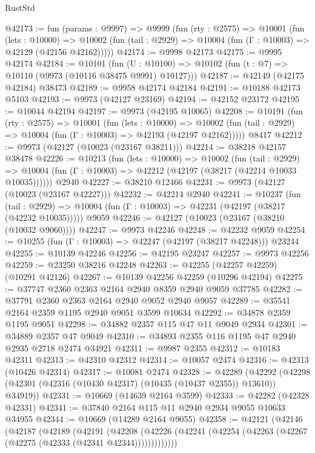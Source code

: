 \begin{lexlean}{RustStd}
\begin{coremodule}
@42173 := fun (params : @9997) =>
  @9999
    (fun (rty : @2575) =>
    @10001
      (fun (lets : @10000) =>
      @10002 (fun (tail : @2929) => @10004 (fun (Γ : @10003) => @42129 (@42156 @42162)))))
@42174 := @9998 @42173
@42175 := @9995 @42174
@42184 := @10101
    (fun (U : @10100) => @10102 (fun (t : @7) => @10110 (@9973 (@10116 @38475 @9991) @10127)))
@42187 := @42149 (@42175 @42184) @38473
@42189 := @9958 @42174 @42184
@42191 := @10188 @42173 @5103
@42193 := @9973 (@42127 @23169)
@42194 := @42152 @23172
@42195 := @10044 @42194
@42197 := @9973 (@42195 @10065)
@42208 := @10191
    (fun (rty : @2575) =>
    @10001
      (fun (lets : @10000) =>
      @10002 (fun (tail : @2929) => @10004 (fun (Γ : @10003) => @42193 (@42197 @42162)))))
    @8417
@42212 := @9973 (@42127 (@10023 (@23167 @38211)))
@42214 := @38218 @42157 @38478
@42226 := @10213
    (fun (lets : @10000) =>
    @10002
      (fun (tail : @2929) =>
      @10004 (fun (Γ : @10003) => @42212 (@42197 (@38217 (@42214 @10033 @10035))))))
    @2940
@42227 := @38210 @12466
@42231 := @9973 (@42127 (@10023 (@23167 @42227)))
@42232 := @42214 @2940
@42241 := @10237
    (fun (tail : @2929) => @10004 (fun (Γ : @10003) => @42231 (@42197 (@38217 (@42232 @10035)))))
    @9059
@42246 := @42127 (@10023 (@23167 (@38210 (@10032 @9060))))
@42247 := @9973 @42246
@42248 := @42232 @9059
@42254 := @10255 (fun (Γ : @10003) => @42247 (@42197 (@38217 @42248))) @23244
@42255 := @10139 @42246
@42256 := @42195 @23247
@42257 := @9973 @42256
@42259 := @23250 @38216 @42248
@42263 := @42255 (@42257 @42259) (@10291 @42126)
@42267 := @10139 @42256 @42259 (@10296 @42194)
@42275 := @37747 @2360 @2363 @2164 @2940 @8359 @2940 @9059 @37785
@42282 := @37791 @2360 @2363 @2164 @2940 @9052 @2940 @9057
@42289 := @35541 @2164 @2359 @1195 @2940 @9051 @3599 @10634
@42292 := @34878 @2359 @1195 @9051
@42298 := @34882 @2357 @115 @47 @11 @9049 @2934
@42301 := @34889 @2357 @47 @9049
@42310 := @34893 @2355 @116 @1195 @47 @2940 @2935 @2718 @2474 @34921
@42311 := @9987 @2355
@42312 := @10183 @42311
@42313 := @42310 @42312
@42314 := @10057 @2474
@42316 := @42313 (@10426 @42314)
@42317 := @10081 @2474
@42328 := @42289
    (@42292 (@42298 (@42301 (@42316 (@10430 @42317) (@10435 (@10437 @2355)) @13610)) @34919))
@42331 := @10669 (@14639 @2164 @3599)
@42333 := @42282 (@42328 @42331)
@42341 := @37840 @2164 @115 @11 @2940 @2934 @9055 @10633 @34955
@42344 := @10669 (@14289 @2164 @9055)
@42358 := @42121
    (@42146
      (@42187
        (@42189
          (@42191
            (@42208
              (@42226 (@42241 (@42254 (@42263 (@42267 (@42275 (@42333 (@42341 @42344)))))))))))))

\end{coremodule}
\end{lexlean}
